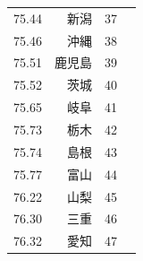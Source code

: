 \begin{table}[ht]
\begin{tabular}{rrlr}
 75.44 & 新潟 &  37 \\
 75.46 & 沖縄 &  38 \\
 75.51 & 鹿児島 &  39 \\
 75.52 & 茨城 &  40 \\
 75.65 & 岐阜 &  41 \\
 75.73 & 栃木 &  42 \\
 75.74 & 島根 &  43 \\
 75.77 & 富山 &  44 \\
 76.22 & 山梨 &  45 \\
 76.30 & 三重 &  46 \\
 76.32 & 愛知 &  47 \\
   \hline
\end{tabular}
\end{table}





%
%
%
%
%
%
%
%
%
%
%
%
%
%
%
%
%
%
%
%
%
%
%





